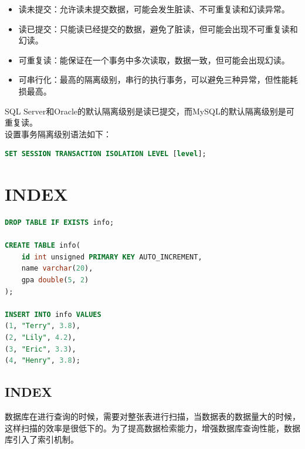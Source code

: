 \documentclass[12pt, openany, oneside]{book}
\begin{document}
\begin{itemize}
	\item 读未提交：允许读未提交数据，可能会发生脏读、不可重复读和幻读异常。

	\item 读已提交：只能读已经提交的数据，避免了脏读，但可能会出现不可重复读和幻读。

	\item 可重复读：能保证在一个事务中多次读取，数据一致，但可能会出现幻读。

	\item 可串行化：最高的隔离级别，串行的执行事务，可以避免三种异常，但性能耗损最高。
\end{itemize}

SQL Server和Oracle的默认隔离级别是读已提交，而MySQL的默认隔离级别是可重复读。\\

设置事务隔离级别语法如下：

\vspace{-0.5cm}

\begin{lstlisting}[language=SQL]
SET SESSION TRANSACTION ISOLATION LEVEL [level];
\end{lstlisting}

\newpage

\chapter{INDEX}

\vspace{0.5cm}


\begin{lstlisting}[language=SQL]
DROP TABLE IF EXISTS info;

CREATE TABLE info(
    id int unsigned PRIMARY KEY AUTO_INCREMENT,
    name varchar(20),
    gpa double(5, 2)
);

INSERT INTO info VALUES
(1, "Terry", 3.8),
(2, "Lily", 4.2),
(3, "Eric", 3.3),
(4, "Henry", 3.8);
\end{lstlisting}

\vspace{0.5cm}

\section{INDEX}

数据库在进行查询的时候，需要对整张表进行扫描，当数据表的数据量大的时候，这样扫描的效率是很低下的。为了提高数据检索能力，增强数据库查询性能，数据库引入了索引机制。\\
\end{document}
